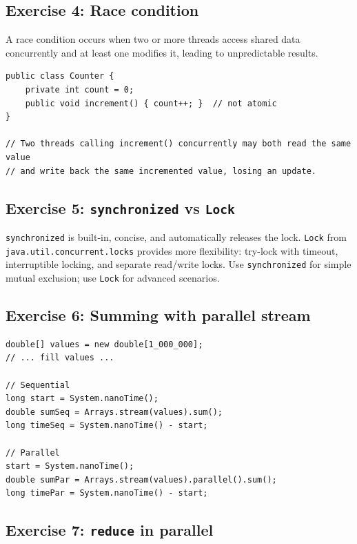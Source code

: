\documentclass[twoside=false,DIV=14]{scrartcl}
\begin{document}
\subsection*{Exercise 4: Race condition}

A race condition occurs when two or more threads access shared data concurrently and at least one modifies it, leading to unpredictable results.

\begin{lstlisting}
public class Counter {
    private int count = 0;
    public void increment() { count++; }  // not atomic
}

// Two threads calling increment() concurrently may both read the same value
// and write back the same incremented value, losing an update.
\end{lstlisting}

\subsection*{Exercise 5: \texttt{synchronized} vs \texttt{Lock}}

\texttt{synchronized} is built-in, concise, and automatically releases the lock.  \texttt{Lock} from \texttt{java.util.concurrent.locks} provides more flexibility: try-lock with timeout, interruptible locking, and separate read/write locks.  Use \texttt{synchronized} for simple mutual exclusion; use \texttt{Lock} for advanced scenarios.

\subsection*{Exercise 6: Summing with parallel stream}

\begin{lstlisting}
double[] values = new double[1_000_000];
// ... fill values ...

// Sequential
long start = System.nanoTime();
double sumSeq = Arrays.stream(values).sum();
long timeSeq = System.nanoTime() - start;

// Parallel
start = System.nanoTime();
double sumPar = Arrays.stream(values).parallel().sum();
long timePar = System.nanoTime() - start;
\end{lstlisting}

\subsection*{Exercise 7: \texttt{reduce} in parallel}
\end{document}
